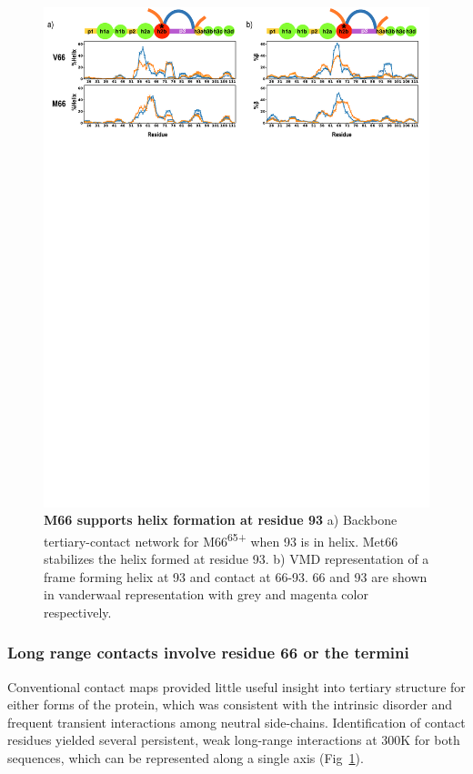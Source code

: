 \documentclass[10pt,letterpaper]{article}
\begin{document}
\begin{figure}[!ht]
\includegraphics[scale=0.1,width=12cm,trim={0 0cm 0 0cm},clip]{../figures/fig6.pdf}
\caption{{\bf M66 supports helix formation at residue 93 } 
a) Backbone tertiary-contact network for M66\textsuperscript{65+} when 93 is in helix. Met66 stabilizes the helix formed at residue 93. b) VMD representation of a frame forming helix at 93 and contact at 66-93. 66 and 93 are shown in vanderwaal representation with grey and magenta color respectively.}
\label{fig6}
\end{figure}



\subsubsection*{Long range contacts involve residue 66 or the termini} 

Conventional contact maps provided little useful insight into tertiary structure for either forms of the protein, which was consistent with the intrinsic disorder and frequent transient interactions among neutral side-chains. Identification of contact residues yielded several persistent, weak long-range interactions at 300K for both sequences, which can be represented along a single axis (Fig~\ref{fig6}). 
\end{document}
